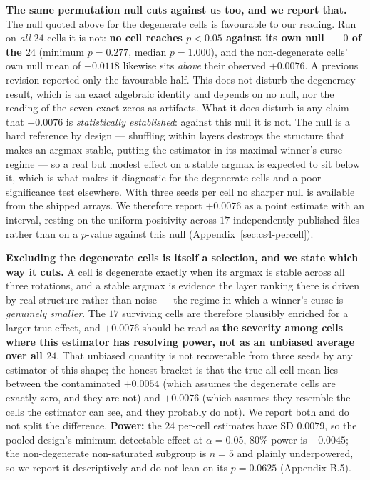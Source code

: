 \documentclass[10pt]{article} %
\begin{document}
\textbf{The same permutation null cuts against us too, and we report that.}
The null quoted above for the degenerate cells is favourable to our reading.
Run on \emph{all} $24$ cells it is not: \textbf{no cell reaches $p<0.05$
against its own null --- $0$ of the $24$} (minimum $p=0.277$, median
$p=1.000$), and the
non-degenerate cells' own null mean of $+0.0118$ likewise sits \emph{above}
their observed $+0.0076$. A previous revision reported only the favourable
half. This does not disturb the degeneracy result, which is an exact algebraic
identity and depends on no null, nor the reading of the seven exact zeros as
artifacts. What it does disturb is any claim that $+0.0076$ is
\emph{statistically established}: against this null it is not. The null is a
hard reference by design --- shuffling within layers destroys the structure
that makes an argmax stable, putting the estimator in its
maximal-winner's-curse regime --- so a real but modest effect on a stable
argmax is expected to sit below it, which is what makes it diagnostic for the
degenerate cells and a poor significance test elsewhere. With three seeds per
cell no sharper null is available from the shipped arrays. We therefore report
$+0.0076$ as a point estimate with an interval, resting on the uniform
positivity across $17$ independently-published files rather than on a
$p$-value against this null (Appendix~\ref{sec:cs4-percell}).

\textbf{Excluding the degenerate cells is itself a selection, and we state which
way it cuts.} A cell is degenerate exactly when its argmax is stable across all
three rotations, and a stable argmax is evidence the layer ranking there is
driven by real structure rather than noise --- the regime in which a winner's
curse is \emph{genuinely smaller}. The $17$ surviving cells are therefore
plausibly enriched for a larger true effect, and $+0.0076$ should be read as
\textbf{the severity among cells where this estimator has resolving power, not
as an unbiased average over all $24$}. That unbiased quantity is not
recoverable from three seeds by any estimator of this shape; the honest bracket
is that the true all-cell mean lies between the contaminated $+0.0054$ (which
assumes the degenerate cells are exactly zero, and they are not) and $+0.0076$
(which assumes they resemble the cells the estimator can see, and they probably
do not). We report both and do not split the difference. \textbf{Power:} the
$24$ per-cell estimates have SD $0.0079$, so the pooled design's minimum
detectable effect at $\alpha=0.05$, $80\%$ power is $+0.0045$; the
non-degenerate non-saturated subgroup is $n=5$ and plainly underpowered, so we
report it descriptively and do not lean on its $p=0.0625$ (Appendix B.5).
\end{document}
